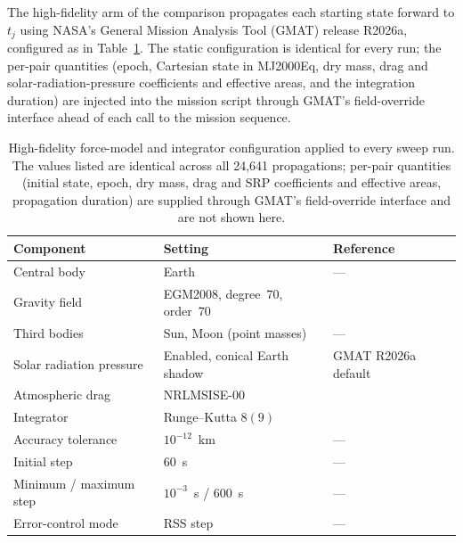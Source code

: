 \documentclass[10pt, letterpaper]{article}
\begin{document}
The high-fidelity arm of the comparison propagates each starting state
forward to $t_{j}$ using NASA's General Mission Analysis Tool (GMAT)
release R2026a, configured as in Table~\ref{tab:force-model}. The
static configuration is identical for every run; the per-pair
quantities (epoch, Cartesian state in MJ2000Eq, dry mass, drag and
solar-radiation-pressure coefficients and effective areas, and the
integration duration) are injected into the mission script through
GMAT's field-override interface ahead of each call to the mission
sequence.

\begin{table}[ht]
  \centering
  \caption{High-fidelity force-model and integrator configuration
  applied to every sweep run. The values listed are identical across
  all 24{,}641 propagations; per-pair quantities (initial state,
  epoch, dry mass, drag and SRP coefficients and effective areas,
  propagation duration) are supplied through GMAT's field-override
  interface and are not shown here.}
  \label{tab:force-model}
  \begin{tabular}{lll}
    \toprule
    Component & Setting & Reference \\
    \midrule
    Central body                 & Earth                              & --- \\
    Gravity field                & EGM2008, degree~$70$, order~$70$   & \citet{pavlis2012} \\
    Third bodies                 & Sun, Moon (point masses)           & --- \\
    Solar radiation pressure     & Enabled, conical Earth shadow      & GMAT R2026a default \\
    Atmospheric drag             & NRLMSISE-00                        & \citet{picone2002} \\
    \midrule
    Integrator                   & Runge--Kutta $8(9)$                & \citet{verner1978} \\
    Accuracy tolerance           & $10^{-12}$~km                       & --- \\
    Initial step                 & $60$~s                              & --- \\
    Minimum / maximum step       & $10^{-3}$~s / $600$~s               & --- \\
    Error-control mode           & RSS step                            & --- \\
    \bottomrule
  \end{tabular}
\end{table}
\end{document}
